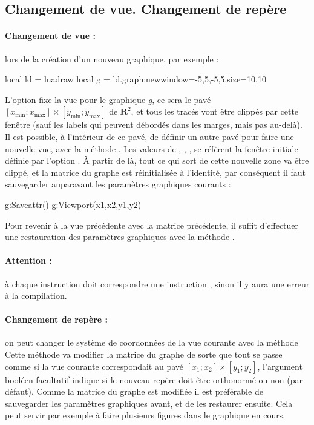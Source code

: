 \subsection{Changement de vue. Changement de repère}

\paragraph{Changement de vue : } lors de la création d'un nouveau graphique, par exemple :
\begin{Luacode}
local ld = luadraw
local g = ld.graph:new{window={-5,5,-5,5},size={10,10}}
\end{Luacode}
L'option  fixe la vue pour le graphique \emph{g}, ce sera le pavé $[x_{\mathrm{min}}; x_{\mathrm{max}}]\times [y_{\mathrm{min}}; y_{\mathrm{max}}]$ de $\mathbf R^2$, et tous les tracés vont être clippés par cette fenêtre (sauf les labels qui peuvent débordés dans les marges, mais pas au-delà).
Il est possible, à l'intérieur de ce pavé, de définir un autre pavé pour faire une nouvelle vue, avec la méthode . Les valeurs de , , ,  se réfèrent la fenêtre initiale définie par l'option . À partir de là, tout ce qui sort de cette nouvelle zone va être clippé, et la matrice du graphe est réinitialisée à l'identité, par conséquent il faut sauvegarder auparavant les paramètres graphiques courants :
\begin{Luacode}
g:Saveattr()
g:Viewport(x1,x2,y1,y2)
\end{Luacode}
Pour revenir à la vue précédente avec la matrice précédente, il suffit d'effectuer une restauration des paramètres graphiques avec la méthode .

\paragraph{Attention : } à chaque instruction  doit correspondre une instruction , sinon il y aura une erreur à la compilation.

\paragraph{Changement de repère : } on peut changer le système de coordonnées de la vue courante avec la méthode 
Cette méthode va modifier la matrice du graphe de sorte que tout se passe comme si la vue courante correspondait au pavé $[x_1;x_2]\times[y_1;y_2]$, l'argument booléen facultatif  indique si le nouveau repère doit être orthonormé ou non (\false par défaut). Comme la matrice du graphe est modifiée il est préférable de sauvegarder les paramètres graphiques avant, et de les restaurer ensuite. Cela peut servir par exemple à faire plusieurs figures dans le graphique en cours.

